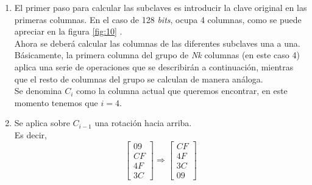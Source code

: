 \documentclass[peerreview]{IEEEtran}
\begin{document}
\begin{enumerate}
	\item El primer paso para calcular las subclaves es introducir la clave original en las primeras columnas. En el caso de 128 \textit{bits}, ocupa 4 columnas, como se puede apreciar en la figura \ref{fig:10} .\\
	
	Ahora se deberá calcular las columnas de las diferentes subclaves una a una.
	Básicamente, la primera columna del grupo de \textit{Nk} columnas (en este caso 4) aplica una serie de operaciones que se describirán a continuación, mientras que el resto de columnas del grupo se calculan de manera análoga.\\
	
	Se denomina $C_i$ como la columna actual que queremos encontrar, en este momento tenemos que $i=4$.
	\item Se aplica sobre $C_{i-1}$ una rotación hacia arriba.\\
	Es decir,
	\[\begin{bmatrix}
		09 \\
		CF \\
		4F \\
		3C 
	\end{bmatrix} \Rightarrow  \begin{bmatrix}
		CF \\
		4F \\
		3C \\
		09 
	\end{bmatrix} \]


\end{enumerate}
\end{document}
